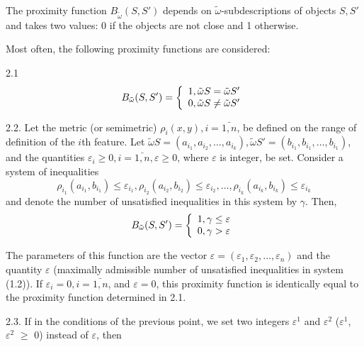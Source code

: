 The proximity function $B_{\tilde{\omega}}(S, S')$ depends on $\tilde{\omega}$-subdescriptions 
of objects $S, S'$ and takes two values: 0 if the objects are not close and 1 otherwise. 

Most often, the following proximity functions are considered:

2.1
\begin{equation}
B_{\tilde{\omega}}(S, S') = \left\{ 
  \begin{array}{l l}
    1, \tilde{\omega}S = \tilde{\omega}S' \\
    0, \tilde{\omega}S \neq \tilde{\omega}S'
  \end{array} \right.
\end{equation}

2.2. Let the metric (or semimetric) $\rho_i(x, y), i = \bar{1,n}$, be defined on the 
range of definition of the $i$th feature. 
Let $\tilde{\omega}S=(a_{i_1}, a_{i_2}, \ldots, a_{i_k}), \tilde{\omega}S' = (b_{i_1}, b_{i_1}, \ldots, b_{i_1})$,
and the quantities $\varepsilon_i \geq 0, i = \bar{1, n}, \varepsilon \geq 0$, where $\varepsilon$ 
is integer, be set. Consider a system of inequalities
\begin{equation}
	\rho_{i_1}(a_{i_1}, b_{i_1}) \leq \varepsilon_{i_1},
	\rho_{i_2}(a_{i_2}, b_{i_2}) \leq \varepsilon_{i_2},
	\ldots,
	\rho_{i_k}(a_{i_k}, b_{i_k}) \leq \varepsilon_{i_k}	
\end{equation}
and denote the number of unsatisfied inequalities in this system by $\gamma$. Then,
\begin{equation}
B_{\tilde{\omega}}(S,S') = \left\{ 
  \begin{array}{l l}
    1, \gamma \leq \varepsilon \\
    0, \gamma > \varepsilon
  \end{array} \right.
\end{equation}

The parameters of this function are the vector 
$\varepsilon = (\varepsilon_1, \varepsilon_2, \ldots, \varepsilon_n)$ 
and the quantity $\varepsilon$ (maximally admissible number of unsatisfied 
inequalities in system (1.2)). If $\varepsilon_i = 0, i = \bar{1,n}$, and $\varepsilon = 0$, this 
proximity function is identically equal to the proximity 
function determined in 2.1.

2.3.  If in the conditions of the previous point, we set two 
integers $\varepsilon^1$ and $\varepsilon^2$ ($\varepsilon^1$, $\varepsilon^2$ $\geq$ 0) instead 
of $\varepsilon$, then

